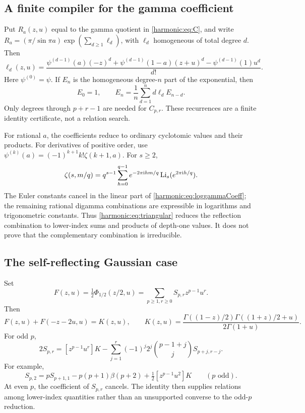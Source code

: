 \subsection{A finite compiler for the gamma coefficient}
Put $R_a(z,u)$ equal to the gamma quotient in \eqref{harmonic:eq:C}, and write
$R_a=(\pi/\sin\pi a)\exp(\sum_{d\ge1}\ell_d)$, with $\ell_d$ homogeneous of total degree $d$. Then
\begin{equation}\label{harmonic:eq:loggammaCoeff}
 \ell_d(z,u)=\frac{\psi^{(d-1)}(a)(-z)^d
       +\psi^{(d-1)}(1-a)(z+u)^d
       -\psi^{(d-1)}(1)u^d}{d!}.
\end{equation}
Here $\psi^{(0)}=\psi$. If $E_n$ is the homogeneous degree-$n$ part of the exponential, then
\begin{equation}\label{harmonic:eq:expRec}
 E_0=1,\qquad E_n=\frac1n\sum_{d=1}^n d\ell_d E_{n-d}.
\end{equation}
Only degrees through $p+r-1$ are needed for $C_{p,r}$. These recurrences are a finite identity certificate, not a relation search.

For rational $a$, the coefficients reduce to ordinary cyclotomic values and their products. For derivatives of positive order, use
$\psi^{(k)}(a)=(-1)^{k+1}k!\zeta(k+1,a)$. For $s\ge2$,
\[
 \zeta(s,m/q)=q^{s-1}\sum_{h=0}^{q-1}
 e^{-2\pi\mathrm{i} hm/q}\operatorname{Li}_s(e^{2\pi\mathrm{i} h/q}).
\]
The Euler constants cancel in the linear part of \eqref{harmonic:eq:loggammaCoeff}; the remaining rational digamma combinations are expressible in logarithms and trigonometric constants. Thus \eqref{harmonic:eq:triangular} reduces the reflection combination to lower-index sums and products of depth-one values. It does not prove that the complementary combination is irreducible.

\subsection{The self-reflecting Gaussian case}
Set
\[
 F(z,u)=\tfrac12\Phi_{1/2}(z/2,u)
       =\sum_{p\ge1,r\ge0}S_{p,r}z^{p-1}u^r.
\]
Then
\begin{equation}\label{harmonic:eq:Freflection}
 F(z,u)+F(-z-2u,u)=K(z,u),\qquad
 K(z,u)=\frac{\Gamma((1-z)/2)\Gamma((1+z)/2+u)}{2\Gamma(1+u)}.
\end{equation}
For odd $p$,
\begin{equation}\label{harmonic:eq:GaussianTriangle}
 2S_{p,r}=[z^{p-1}u^r]K
   -\sum_{j=1}^r(-1)^j2^j\binom{p-1+j}{j}S_{p+j,r-j}.
\end{equation}
For example,
\[
 S_{p,2}=pS_{p+1,1}-p(p+1)\beta(p+2)
               +\tfrac12[z^{p-1}u^2]K\qquad(p\text{ odd}).
\]
At even $p$, the coefficient of $S_{p,r}$ cancels. The identity then supplies relations among lower-index quantities rather than an unsupported converse to the odd-$p$ reduction.

